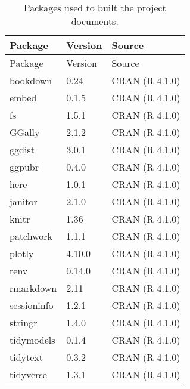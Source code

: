 \documentclass[
  12pt,
  a4paper,
  oneside]{krantz}
\begin{document}
\begin{longtable}[]{@{}lll@{}}
\caption{\label{tab:colophon}Packages used to built the project documents.}\tabularnewline
\toprule
Package & Version & Source\tabularnewline
\midrule
\endfirsthead
\toprule
Package & Version & Source\tabularnewline
\midrule
\endhead
bookdown & 0.24 & CRAN (R 4.1.0)\tabularnewline
embed & 0.1.5 & CRAN (R 4.1.0)\tabularnewline
fs & 1.5.1 & CRAN (R 4.1.0)\tabularnewline
GGally & 2.1.2 & CRAN (R 4.1.0)\tabularnewline
ggdist & 3.0.1 & CRAN (R 4.1.0)\tabularnewline
ggpubr & 0.4.0 & CRAN (R 4.1.0)\tabularnewline
here & 1.0.1 & CRAN (R 4.1.0)\tabularnewline
janitor & 2.1.0 & CRAN (R 4.1.0)\tabularnewline
knitr & 1.36 & CRAN (R 4.1.0)\tabularnewline
patchwork & 1.1.1 & CRAN (R 4.1.0)\tabularnewline
plotly & 4.10.0 & CRAN (R 4.1.0)\tabularnewline
renv & 0.14.0 & CRAN (R 4.1.0)\tabularnewline
rmarkdown & 2.11 & CRAN (R 4.1.0)\tabularnewline
sessioninfo & 1.2.1 & CRAN (R 4.1.0)\tabularnewline
stringr & 1.4.0 & CRAN (R 4.1.0)\tabularnewline
tidymodels & 0.1.4 & CRAN (R 4.1.0)\tabularnewline
tidytext & 0.3.2 & CRAN (R 4.1.0)\tabularnewline
tidyverse & 1.3.1 & CRAN (R 4.1.0)\tabularnewline
\bottomrule
\end{longtable}

\backmatter

  

\end{document}
